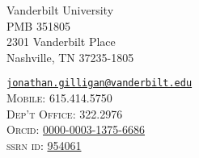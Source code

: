 \noindent
\parbox[t]{0.45\textwidth}{%
Vanderbilt University\\
PMB 351805\\
2301 Vanderbilt Place\\
Nashville, TN 37235-1805
}
\parbox[t]{0.5\textwidth}{\raggedleft
	{%
    \href{mailto:jonathan.gilligan@vanderbilt.edu}{\nolinkurl{jonathan.gilligan@vanderbilt.edu}}%
	}\\
    \textsc{Mobile:} 615.414.5750\\
    \textsc{Dep't Office:} 322.2976\\
    \textsc{Orcid:} \href{https://orcid.org/0000-0003-1375-6686}{0000-0003-1375-6686}\\
    \textsc{ssrn id:} \href{https://papers.ssrn.com/sol3/cf_dev/AbsByAuth.cfm?per_id=954061}{954061}\\
    \qquad{}
}
